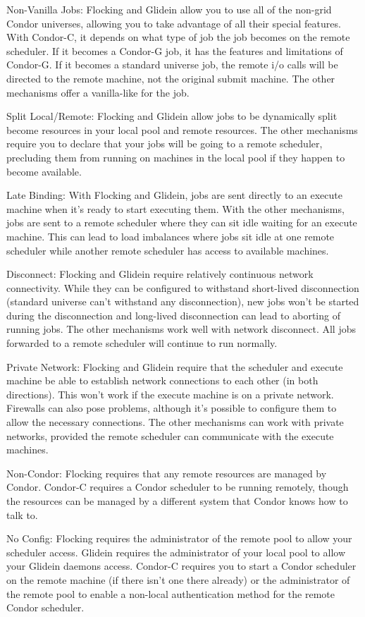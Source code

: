 Non-Vanilla Jobs: Flocking and Glidein allow you to use all of the
non-grid Condor universes, allowing you to take advantage of all their
special features. With Condor-C, it depends on what type of job the job
becomes on the remote scheduler. If it becomes a Condor-G job, it has the
features and limitations of Condor-G. If it becomes a standard universe
job, the remote i/o calls will be directed to the remote machine, not the
original submit machine. The other mechanisms offer a vanilla-like for the
job.

Split Local/Remote: Flocking and Glidein allow jobs to be dynamically
split become resources in your local pool and remote resources. The
other mechanisms require you to declare that your jobs will be going to
a remote scheduler, precluding them from running on machines in the local
pool if they happen to become available.

Late Binding: With Flocking and Glidein, jobs are sent directly to an
execute machine when it's ready to start executing them. With the other
mechanisms, jobs are sent to a remote scheduler where they can sit idle
waiting for an execute machine. This can lead to load imbalances where
jobs sit idle at one remote scheduler while another remote scheduler has
access to available machines.

Disconnect: Flocking and Glidein require relatively continuous network
connectivity. While they can be configured to withstand short-lived
disconnection (standard universe can't withstand any disconnection),
new jobs won't be started during the disconnection and long-lived
disconnection can lead to aborting of running jobs. The other mechanisms
work well with network disconnect. All jobs forwarded to a remote
scheduler will continue to run normally.

Private Network: Flocking and Glidein require that the scheduler and
execute machine be able to establish network connections to each other
(in both directions). This won't work if the execute machine is on a
private network. Firewalls can also pose problems, although it's possible
to configure them to allow the necessary connections. The other 
mechanisms can work with private networks, provided the remote scheduler
can communicate with the execute machines.

Non-Condor: Flocking requires that any remote resources are managed by
Condor. Condor-C requires a Condor scheduler to be running remotely,
though the resources can be managed by a different system that Condor
knows how to talk to.

No Config: Flocking requires the administrator of the remote pool to 
allow your scheduler access. Glidein requires the administrator of your
local pool to allow your Glidein daemons access. Condor-C requires you
to start a Condor scheduler on the remote machine (if there isn't one
there already) or the administrator of the remote pool to enable a
non-local authentication method for the remote Condor scheduler.

